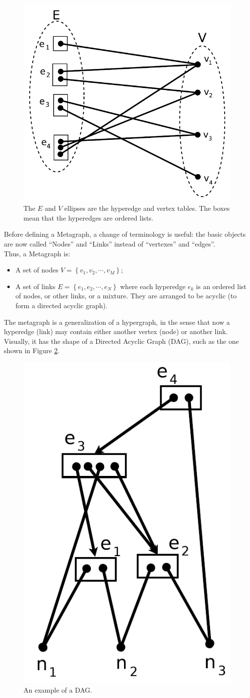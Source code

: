 \begin{figure} [h]
\centering
\includegraphics[width=0.6
\textwidth]{figures/Magistrale/hypergraph_graph}
\caption[Hypergraph as bipartite graph]{The $E$ and $V$ ellipses are the hyperedge and vertex tables. The boxes mean that the hyperedges are ordered lists.
\label{fig:hypergraph_graph}}
\end{figure}

Before defining a Metagraph, a change of terminology is useful: the basic objects are now called \enquote{Nodes} and \enquote{Links} instead of \enquote{vertexes} and \enquote{edges}. \\
Thus, a Metagraph is:
\begin{itemize}
	\item A set of nodes $V=\left\{v_{1}, v_{2}, \cdots, v_{M}\right\}$;
	\item A set of links $E=\left\{e_{1}, e_{2}, \cdots, e_{N}\right\}$ where each hyperedge $e_{k}$ is an ordered list of nodes, or other links, or a mixture. They are arranged to be acyclic (to form a directed acyclic graph).
\end{itemize}

The metagraph is a generalization of a hypergraph, in the sense that now a hyperedge (link) may contain either another vertex (node) or another link. Visually, it has the shape of a Directed Acyclic Graph (DAG), such as the one shown in Figure \ref{fig:metagraph_graph}.

\begin{figure} [h]
\centering
\includegraphics[width=0.4
\textwidth]{figures/Magistrale/metagraph_graph}
\caption[Directed Acyclic Graph ]{An example of a DAG.
\label{fig:metagraph_graph}}
\end{figure}

